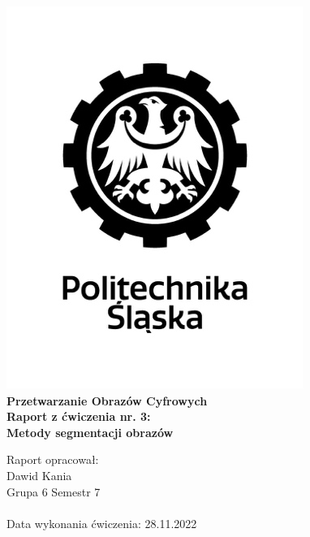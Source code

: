 
\begin{titlepage}
    \begin{center}
        \includegraphics[width=.50\linewidth]{other/polsl.png}\\
        \Huge
        \textbf{Przetwarzanie Obrazów Cyfrowych}
        \\ \vspace{1.5cm}
        \Large
        \textbf{Raport z ćwiczenia nr. 3: } \\
        \textbf{Metody segmentacji obrazów}        
    \end{center}
    \vspace{2.5cm}
    \Large
    Raport opracował: \\
    Dawid Kania \\
    Grupa 6 Semestr 7 \\ \\
    Data wykonania ćwiczenia: 28.11.2022
\end{titlepage}
